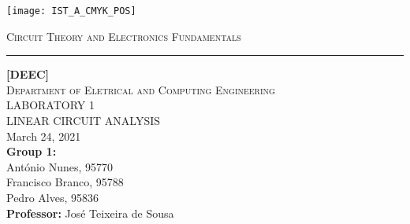 \thispagestyle {empty}

\begin{titlepage}

\texttt{[image: IST\_A\_CMYK\_POS]} \\[1cm]

\centering

\textsc{\large{Circuit Theory and Electronics Fundamentals}} \\[0.5cm]
\hrule
\vspace{1.75cm}

\textsc{\textbf {[DEEC]}} \\[0.5cm]
\textsc{Department of Eletrical and Computing Engineering} \\[3.25cm]
\MakeUppercase{\Huge Laboratory 1} \\[0.75cm]
\MakeUppercase{\huge Linear Circuit Analysis} \\[3.5cm]
March 24, 2021 \\[2.5cm]
\textbf{Group 1:} \\[0.5cm]
António Nunes, 95770 \\
Francisco Branco, 95788 \\
Pedro Alves, 95836 \\[1cm]
\textbf{Professor:} José Teixeira de Sousa 
\end{titlepage}


